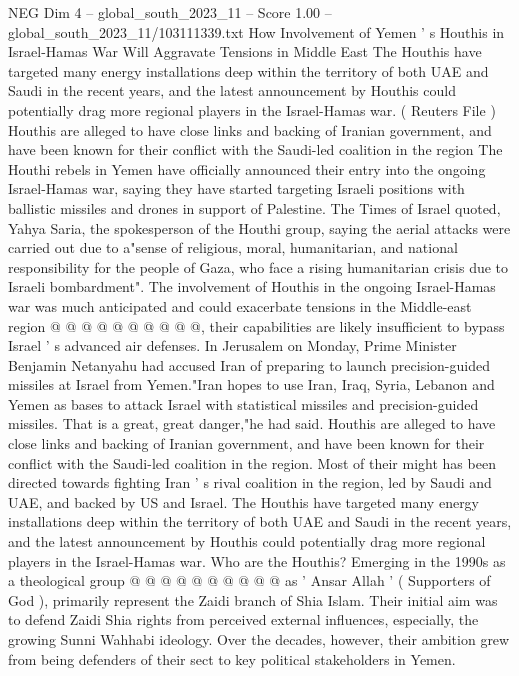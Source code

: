 \begin{textsample}{NEG Dim 4 – global\_south\_2023\_11 – Score 1.00 – global\_south\_2023\_11/103111339.txt}  \label{ex:f4_neg_297}
How Involvement of Yemen ' s Houthis in Israel-Hamas War Will Aggravate Tensions in Middle East The Houthis have targeted many energy installations deep within the territory of both UAE and Saudi in the recent years, and the latest announcement by Houthis could potentially drag more regional players in the Israel-Hamas war. ( Reuters File ) Houthis are alleged to have close links and backing of Iranian government, and have been known for their conflict with the Saudi-led coalition in the region The Houthi rebels in Yemen have officially announced their entry into the ongoing Israel-Hamas war, saying they have started targeting Israeli positions with ballistic missiles and drones in support of Palestine.
The Times of Israel quoted, Yahya Saria, the spokesperson of the Houthi group, saying the aerial attacks were carried out due to a"sense of religious, moral, humanitarian, and national responsibility for the people of Gaza, who face a rising humanitarian crisis due to Israeli bombardment".
The involvement of Houthis in the ongoing Israel-Hamas war was much anticipated and could exacerbate tensions in the Middle-east region @ @ @ @ @ @ @ @ @ @, their capabilities are likely insufficient to bypass Israel ' s advanced air defenses.
In Jerusalem on Monday, Prime Minister Benjamin Netanyahu had accused Iran of preparing to launch precision-guided missiles at Israel from Yemen."Iran hopes to use Iran, Iraq, Syria, Lebanon and Yemen as bases to attack Israel with statistical missiles and precision-guided missiles.
That is a great, great danger,"he had said.
Houthis are alleged to have close links and backing of Iranian government, and have been known for their conflict with the Saudi-led coalition in the region.
Most of their might has been directed towards fighting Iran ' s rival coalition in the region, led by Saudi and UAE, and backed by US and Israel.
The Houthis have targeted many energy installations deep within the territory of both UAE and Saudi in the recent years, and the latest announcement by Houthis could potentially drag more regional players in the Israel-Hamas war.
Who are the Houthis?
Emerging in the 1990s as a theological group @ @ @ @ @ @ @ @ @ @ as ' Ansar Allah ' ( Supporters of God ), primarily represent the Zaidi branch of Shia Islam.
Their initial aim was to defend Zaidi Shia rights from perceived external influences, especially, the growing Sunni Wahhabi ideology.
Over the decades, however, their ambition grew from being defenders of their sect to key political stakeholders in Yemen.

\end{textsample}
